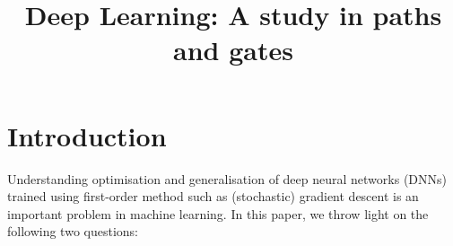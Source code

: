 \documentclass{article}
\title{Deep Learning: A study in paths and gates}
\begin{document}
\maketitle
\section{Introduction}
Understanding optimisation and generalisation of deep neural networks (DNNs) trained using first-order method such as (stochastic) gradient descent is an important problem in machine learning. In this paper, we throw light on the following two questions:%
\begin{comment}
Recent works based on the \emph{trajectory} analysis \cite{} have shown that, sufficiently over-parameterised DNNs can be optimised to achieve zero training error by a randomly initialised SGD procedure. The gist of the \emph{trajectory} based analysis is the following: consider the dataset given by $(x_s,y_s)_{i=1}^n\in \R^{d_{in}\times} \R$, and for an input $x_s\in \R^{d_{in}},i\in[n]$\footnote{We denote the set $\{1,\ldots, n\}$ by $[n]$.}, let $\hat{y}_{\Theta_t}(x_s)$ be predicted output of the DNN whose parameters/tunable weights at time $t$ is $\Theta_t\in \R^{d_{net}}$. Say one is interested in minimising the squared loss given by $L_{\Theta_t}=\frac{1}{2}\sum_{i=1}^n\left(\hat{y}_{\Theta_t}(x_s)-y_s\right)^2$ by a SGD procedure, then the idea behind the trajectory analysis is to look at the dynamics of the error term defined as $e_t(i)\stackrel{def}{=}\hat{y}_{\Theta_t}(x_s) -y_s$. Denoting $e_t=(e_t(i),i\in[n])\in \R^n$, one can study the following error recursion:
\begin{align}\label{eq:trajecbasic}
e_{t+1}=e_t-\alpha_t K_t e_t,
\end{align}
where $\alpha_t>0$ is a small stepsize, $K_t\in \R^{n\times n}$ is a Gram matrix. This gram matrix is in turn expressed as $K_t=\Psi_t^\top \Psi_t$, wherein, $\Psi_t$ is a $d_{net}\times n$ matrix known as the \emph{neural tangent feature} (NTF) matrix, which is the collection of the gradient of the network output with respect to the network parameters, and whose $s^{th}$ column is given by $\Psi_t(s)=(\frac{\partial \hat{y}_{\Theta_t}(x_s)}{\partial \theta},\theta \in \Theta)$.
\end{comment}
\end{document}

